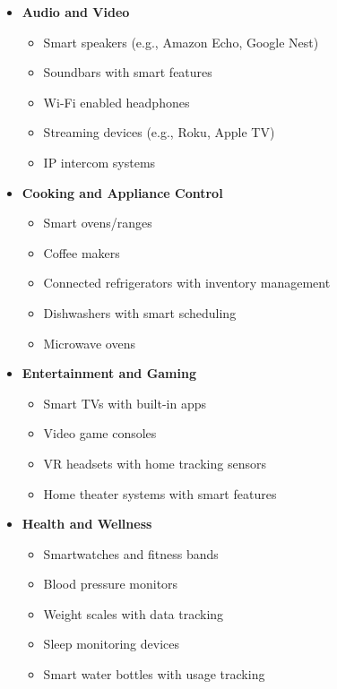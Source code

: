 \documentclass[10pt, journal]{IEEEtran} %
\begin{document}
\begin{itemize}[]
    \item{\textbf{Audio and Video}}
        \begin{itemize}
            \item Smart speakers (e.g., Amazon Echo, Google Nest)
            \item Soundbars with smart features
            \item Wi-Fi enabled headphones
            \item Streaming devices (e.g., Roku, Apple TV)
            \item IP intercom systems
        \end{itemize}

    \item{\textbf{Cooking and Appliance Control}}
        \begin{itemize}
            \item Smart ovens/ranges
            \item Coffee makers
            \item Connected refrigerators with inventory management
            \item Dishwashers with smart scheduling
            \item Microwave ovens
        \end{itemize}

    \item{\textbf{Entertainment and Gaming}}
        \begin{itemize}
            \item Smart TVs with built-in apps
            \item Video game consoles
            \item VR headsets with home tracking sensors
            \item Home theater systems with smart features
        \end{itemize}

    \item{\textbf{Health and Wellness}}
        \begin{itemize}
            \item Smartwatches and fitness bands
            \item Blood pressure monitors
            \item Weight scales with data tracking
            \item Sleep monitoring devices
            \item Smart water bottles with usage tracking
        \end{itemize}


\end{itemize}
\end{document}
